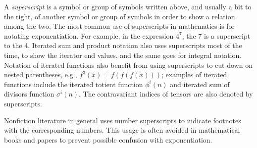 \documentclass[12pt]{article}
\begin{document}
A {\em superscript} is a symbol or group of symbols written above, and usually a bit to the right, of another symbol or group of symbols in order to show a relation among the two. The most common use of superscripts in mathematics is for notating exponentiation. For example, in the expression $4^7$, the 7 is a superscript to the 4. Iterated sum and product notation also uses superscripts most of the time, to show the iterator end values, and the same goes for integral notation. Notation of iterated functions also benefit from using superscripts to cut down on nested parentheses, e.g., $f^3(x) = f(f(f(x)))$; examples of iterated functions include the iterated totient function $\phi^i(n)$ and iterated sum of divisors function $\sigma^i(n)$. The contravariant indices of tensors are also denoted by superscripts.

Nonfiction literature in general uses number superscripts to indicate footnotes with the corresponding numbers. This usage is often avoided in mathematical books and papers to prevent possible confusion with exponentiation.
\end{document}
